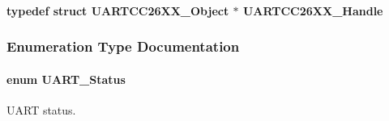 \paragraph[{U\+A\+R\+T\+C\+C26\+X\+X\+\_\+\+Handle}]{\setlength{\rightskip}{0pt plus 5cm}typedef struct {\bf U\+A\+R\+T\+C\+C26\+X\+X\+\_\+\+Object} $\ast$ {\bf U\+A\+R\+T\+C\+C26\+X\+X\+\_\+\+Handle}}\label{_u_a_r_t_c_c26_x_x_8h_a276d493f1689ad8c16b5cfb4dada194a}


\subsubsection{Enumeration Type Documentation}
\paragraph[{U\+A\+R\+T\+\_\+\+Status}]{\setlength{\rightskip}{0pt plus 5cm}enum {\bf U\+A\+R\+T\+\_\+\+Status}}\label{_u_a_r_t_c_c26_x_x_8h_a778bbef5f4b52a5651552136715f53c4}


U\+A\+R\+T status. 

